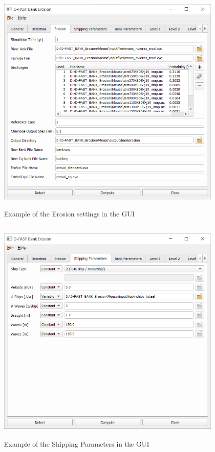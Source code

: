 \begin{figure}[!hb]
\center
\includegraphics[width=\textwidth,height=11.4cm]{figures/gui3.png}
\caption{Example of the Erosion settings in the GUI}
\label{guiErode}
\end{figure}

\clearpage
\begin{figure}[!ht]
\center
\vspace{-0.75cm} 
\includegraphics[width=\textwidth,height=11.4cm]{figures/gui4.png}
\caption{Example of the Shipping Parameters in the GUI}
\label{guiShip}
\vspace{-0.25cm} 
\end{figure}


